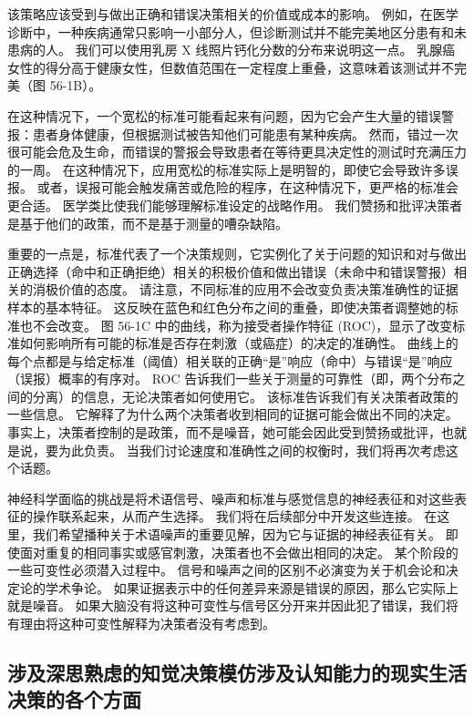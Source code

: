 该策略应该受到与做出正确和错误决策相关的价值或成本的影响。 例如，在医学诊断中，一种疾病通常只影响一小部分人，但诊断测试并不能完美地区分患有和未患病的人。 我们可以使用乳房 X 线照片钙化分数的分布来说明这一点。 乳腺癌女性的得分高于健康女性，但数值范围在一定程度上重叠，这意味着该测试并不完美（图 56-1B）。

在这种情况下，一个宽松的标准可能看起来有问题，因为它会产生大量的错误警报：患者身体健康，但根据测试被告知他们可能患有某种疾病。 然而，错过一次很可能会危及生命，而错误的警报会导致患者在等待更具决定性的测试时充满压力的一周。 在这种情况下，应用宽松的标准实际上是明智的，即使它会导致许多误报。 或者，误报可能会触发痛苦或危险的程序，在这种情况下，更严格的标准会更合适。 医学类比使我们能够理解标准设定的战略作用。 我们赞扬和批评决策者是基于他们的政策，而不是基于测量的嘈杂缺陷。

重要的一点是，标准代表了一个决策规则，它实例化了关于问题的知识和对与做出正确选择（命中和正确拒绝）相关的积极价值和做出错误（未命中和错误警报）相关的消极价值的态度。 请注意，不同标准的应用不会改变负责决策准确性的证据样本的基本特征。 这反映在蓝色和红色分布之间的重叠，即使决策者调整她的标准也不会改变。 图 56-1C 中的曲线，称为接受者操作特征 (ROC)，显示了改变标准如何影响所有可能的标准是否存在刺激（或癌症）的决定的准确性。 曲线上的每个点都是与给定标准（阈值）相关联的正确“是”响应（命中）与错误“是”响应（误报）概率的有序对。 ROC 告诉我们一些关于测量的可靠性（即，两个分布之间的分离）的信息，无论决策者如何使用它。 该标准告诉我们有关决策者政策的一些信息。 它解释了为什么两个决策者收到相同的证据可能会做出不同的决定。 事实上，决策者控制的是政策，而不是噪音，她可能会因此受到赞扬或批评，也就是说，要为此负责。 当我们讨论速度和准确性之间的权衡时，我们将再次考虑这个话题。

神经科学面临的挑战是将术语信号、噪声和标准与感觉信息的神经表征和对这些表征的操作联系起来，从而产生选择。 我们将在后续部分中开发这些连接。 在这里，我们希望播种关于术语噪声的重要见解，因为它与证据的神经表征有关。 即使面对重复的相同事实或感官刺激，决策者也不会做出相同的决定。 某个阶段的一些可变性必须潜入过程中。 信号和噪声之间的区别不必演变为关于机会论和决定论的学术争论。 如果证据表示中的任何差异来源是错误的原因，那么它实际上就是噪音。 如果大脑没有将这种可变性与信号区分开来并因此犯了错误，我们将有理由将这种可变性解释为决策者没有考虑到。

\subsection{涉及深思熟虑的知觉决策模仿涉及认知能力的现实生活决策的各个方面}

